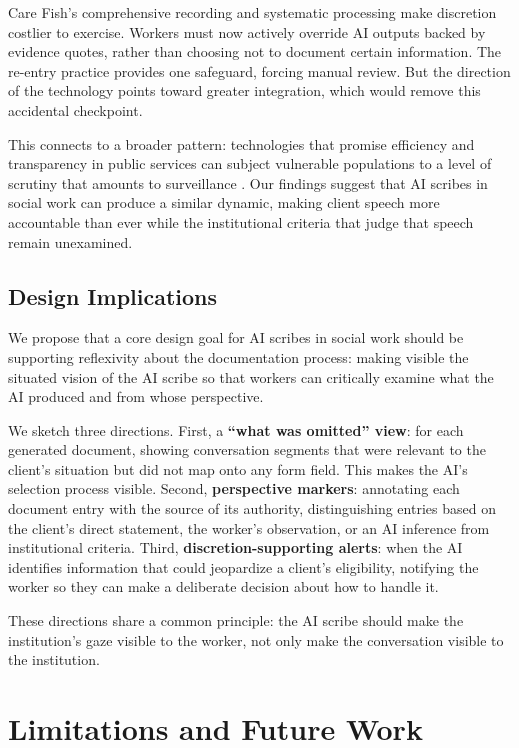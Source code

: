 \documentclass{article}
\begin{document}
Care Fish's comprehensive recording and systematic processing make discretion costlier to exercise. Workers must now actively override AI outputs backed by evidence quotes, rather than choosing not to document certain information. The re-entry practice provides one safeguard, forcing manual review. But the direction of the technology points toward greater integration, which would remove this accidental checkpoint.

This connects to a broader pattern: technologies that promise efficiency and transparency in public services can subject vulnerable populations to a level of scrutiny that amounts to surveillance \citep{eubanks2018automating}. Our findings suggest that AI scribes in social work can produce a similar dynamic, making client speech more accountable than ever while the institutional criteria that judge that speech remain unexamined.

\subsection{Design Implications}

We propose that a core design goal for AI scribes in social work should be supporting reflexivity about the documentation process: making visible the situated vision of the AI scribe so that workers can critically examine what the AI produced and from whose perspective.

We sketch three directions. First, a \textbf{``what was omitted'' view}: for each generated document, showing conversation segments that were relevant to the client's situation but did not map onto any form field. This makes the AI's selection process visible. Second, \textbf{perspective markers}: annotating each document entry with the source of its authority, distinguishing entries based on the client's direct statement, the worker's observation, or an AI inference from institutional criteria. Third, \textbf{discretion-supporting alerts}: when the AI identifies information that could jeopardize a client's eligibility, notifying the worker so they can make a deliberate decision about how to handle it.

These directions share a common principle: the AI scribe should make the institution's gaze visible to the worker, not only make the conversation visible to the institution.

\section{Limitations and Future Work}
\end{document}

